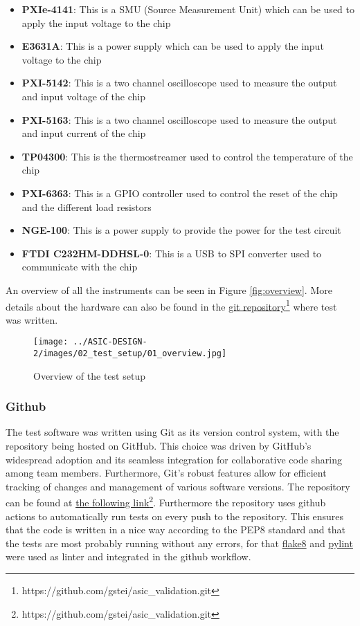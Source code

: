 \begin{itemize}
    \item \textbf{PXIe-4141}: This is a SMU (Source Measurement Unit) which can be used to apply the input voltage to the chip
    \item \textbf{E3631A}: This is a power supply which can be used to apply the input voltage to the chip
    \item \textbf{PXI-5142}: This is a two channel oscilloscope used to measure the output and input voltage of the chip
    \item \textbf{PXI-5163}: This is a two channel oscilloscope used to measure the output and input current of the chip
    \item \textbf{TP04300}: This is the thermostreamer used to control the temperature of the chip
    \item \textbf{PXI-6363}: This is a GPIO controller used to control the reset of the chip and the different load resistors
    \item \textbf{NGE-100}: This is a power supply to provide the power for the test circuit
    \item \textbf{FTDI C232HM-DDHSL-0}: This is a USB to SPI converter used to communicate with the chip
\end{itemize}

An overview of all the instruments can be seen in Figure \autoref{fig:overview}. More details about the hardware can also be found in the \href{https://github.com/gstei/asic_validation/}{git repository}\footnote{https://github.com/gstei/asic\_validation.git} where test was written.

\begin{figure}[h]
    \centering
    \texttt{[image: ../ASIC-DESIGN-2/images/02\_test\_setup/01\_overview.jpg]}
    \caption{Overview of the test setup}
    \label{fig:overview}
\end{figure}

\subsubsection{Github}
The test software was written using Git as its version control system, with the repository being hosted on GitHub. This choice was driven by GitHub's widespread adoption and its seamless integration for collaborative code sharing among team members. Furthermore, Git's robust features allow for efficient tracking of changes and management of various software versions. The repository can be found at \href{https://github.com/gstei/asic_validation.git}{the following link}\footnote{https://github.com/gstei/asic\_validation.git}. Furthermore the repository uses github actions to automatically run tests on every push to the repository. This ensures that the code is written in a nice way according to the PEP8 standard and that the tests are most probably running without any errors, for that \href{par:Flake8}{flake8} and \href{par:Pylint}{pylint} were used as linter and integrated in the github workflow.

